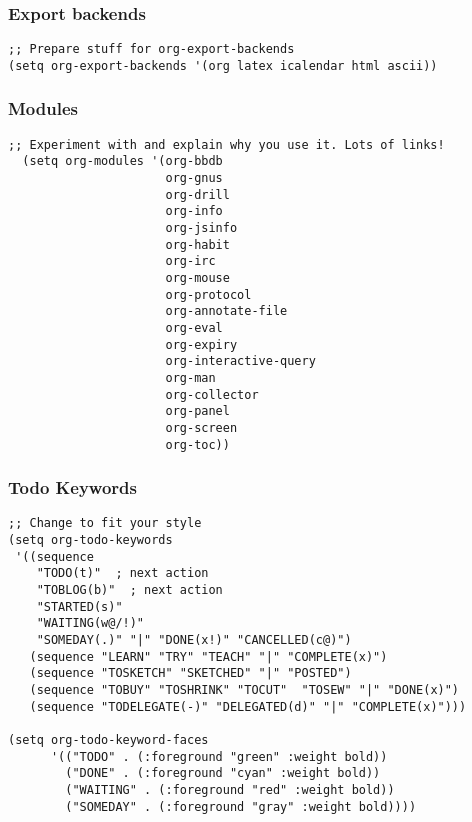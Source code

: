 \documentclass[11pt]{article}
\begin{document}
\subsubsection{Export backends}
\label{sec:org86ae0c2}
\begin{verbatim}
;; Prepare stuff for org-export-backends
(setq org-export-backends '(org latex icalendar html ascii))
\end{verbatim}

\subsubsection{Modules}
\label{sec:org8e937fc}
\begin{verbatim}
;; Experiment with and explain why you use it. Lots of links!
  (setq org-modules '(org-bbdb
                      org-gnus
                      org-drill
                      org-info
                      org-jsinfo
                      org-habit
                      org-irc
                      org-mouse
                      org-protocol
                      org-annotate-file
                      org-eval
                      org-expiry
                      org-interactive-query
                      org-man
                      org-collector
                      org-panel
                      org-screen
                      org-toc))

\end{verbatim}

\subsubsection{Todo Keywords}
\label{sec:org6906a4d}
\begin{verbatim}
;; Change to fit your style
(setq org-todo-keywords
 '((sequence
    "TODO(t)"  ; next action
    "TOBLOG(b)"  ; next action
    "STARTED(s)"
    "WAITING(w@/!)"
    "SOMEDAY(.)" "|" "DONE(x!)" "CANCELLED(c@)")
   (sequence "LEARN" "TRY" "TEACH" "|" "COMPLETE(x)")
   (sequence "TOSKETCH" "SKETCHED" "|" "POSTED")
   (sequence "TOBUY" "TOSHRINK" "TOCUT"  "TOSEW" "|" "DONE(x)")
   (sequence "TODELEGATE(-)" "DELEGATED(d)" "|" "COMPLETE(x)")))

(setq org-todo-keyword-faces
      '(("TODO" . (:foreground "green" :weight bold))
        ("DONE" . (:foreground "cyan" :weight bold))
        ("WAITING" . (:foreground "red" :weight bold))
        ("SOMEDAY" . (:foreground "gray" :weight bold))))

\end{verbatim}
\end{document}
